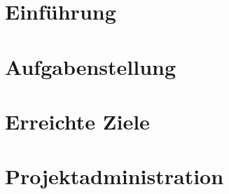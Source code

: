 \documentclass[
11pt, %
a4paper, %
BCOR25mm, %
DIV14, %
footsepline = false, %
headsepline, %
twoside, %
openright,
abstracton, %
listof=totocnumbered, %
bibliography=totocnumbered %
]{scrreprt}
\begin{document}
  
  
      
  
  \chapter{Einführung}
  
    

  \cleardoublepage
 
  
  \chapter{Aufgabenstellung}
  
  

  \cleardoublepage
   
  
  \chapter{Erreichte Ziele}
  
  

  \cleardoublepage
   
    
  \chapter{Projektadministration}
 
  

  \cleardoublepage
   
\end{document}
